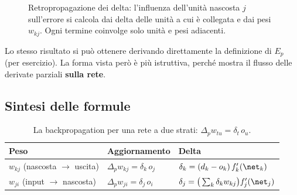 \begin{figure}[ht]
\centering
{}
\caption{Retropropagazione dei delta: l'influenza dell'unità nascosta $j$ sull'errore si calcola dai delta delle
unità a cui è collegata e dai pesi $w_{kj}$. Ogni termine coinvolge solo unità e pesi adiacenti.}
\label{fig:retropropagazione}
\end{figure}

Lo stesso risultato si può ottenere derivando direttamente la definizione di $E_p$ (per esercizio). La forma
vista però è più istruttiva, perché mostra il flusso delle derivate parziali \textbf{sulla rete}.

\subsection{Sintesi delle formule}

\begin{table}[ht]
\centering\small
\caption{La backpropagation per una rete a due strati: $\Delta_pw_{tu} = \delta_t\,o_u$.}
\begin{tabular}{lll}
\toprule
Peso & Aggiornamento & Delta \\
\midrule
$w_{kj}$ (nascosta $\to$ uscita) & $\Delta_pw_{kj} = \delta_k\,o_j$ & $\delta_k = (d_k-o_k)\,f'_k(\net_k)$\\
$w_{ji}$ (input $\to$ nascosta) & $\Delta_pw_{ji} = \delta_j\,o_i$ & $\delta_j = \big(\sum_k\delta_kw_{kj}\big)f'_j(\net_j)$\\
\bottomrule
\end{tabular}
\end{table}

